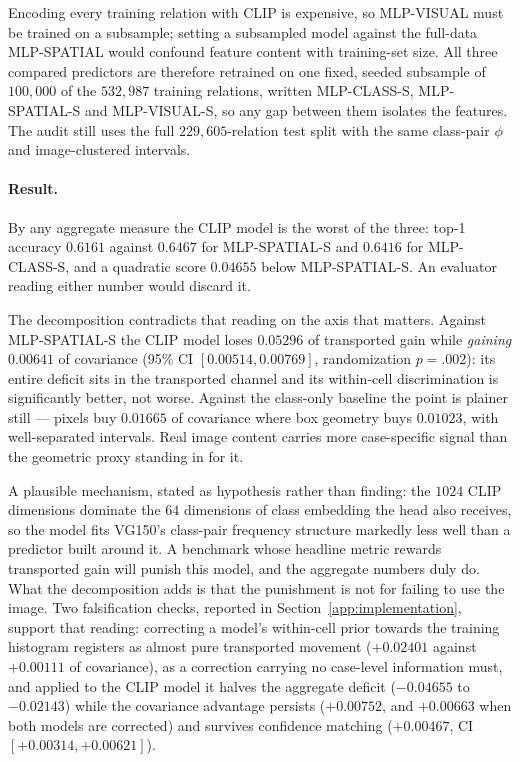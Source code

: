\documentclass[preprint,times,10pt,a4paper]{elsarticle}
\theoremstyle{plain}
\theoremstyle{definition}
\begin{document}
Encoding every training relation with CLIP is expensive, so MLP-VISUAL must be trained on a
subsample; setting a subsampled model against the full-data MLP-SPATIAL would confound
feature content with training-set size. All three compared predictors are therefore
retrained on one fixed, seeded subsample of $100{,}000$ of the $532{,}987$ training
relations, written MLP-CLASS-S, MLP-SPATIAL-S and MLP-VISUAL-S, so any gap between them
isolates the features. The audit still uses the full $229{,}605$-relation test split with
the same class-pair $\phi$ and image-clustered intervals.

\paragraph{Result.} By any aggregate measure the CLIP model is the worst of the three: top-1
accuracy $0.6161$ against $0.6467$ for MLP-SPATIAL-S and $0.6416$ for MLP-CLASS-S, and a
quadratic score $0.04655$ below MLP-SPATIAL-S. An evaluator reading either number would
discard it.

The decomposition contradicts that reading on the axis that matters. Against MLP-SPATIAL-S
the CLIP model loses $0.05296$ of transported gain while \emph{gaining} $0.00641$ of
covariance (95\% CI $[0.00514,0.00769]$, randomization $p=.002$): its entire deficit sits in
the transported channel and its within-cell discrimination is significantly better, not
worse. Against the class-only baseline the point is plainer still --- pixels buy $0.01665$
of covariance where box geometry buys $0.01023$, with well-separated intervals. Real image
content carries more case-specific signal than the geometric proxy standing in for it.

A plausible mechanism, stated as hypothesis rather than finding: the $1024$ CLIP dimensions
dominate the $64$ dimensions of class embedding the head also receives, so the model fits
VG150's class-pair frequency structure markedly less well than a predictor built around it. A
benchmark whose headline metric rewards transported gain will punish this model, and the
aggregate numbers duly do. What the decomposition adds is that the punishment is not for
failing to use the image. Two falsification checks, reported in
Section~\ref{app:implementation}, support that reading: correcting a model's within-cell
prior towards the training histogram registers as almost pure transported movement
($+0.02401$ against $+0.00111$ of covariance), as a correction carrying no case-level
information must, and applied to the CLIP model it halves the aggregate deficit ($-0.04655$
to $-0.02143$) while the covariance advantage persists ($+0.00752$, and $+0.00663$ when both
models are corrected) and survives confidence matching ($+0.00467$, CI
$[+0.00314,+0.00621]$).
\end{document}
